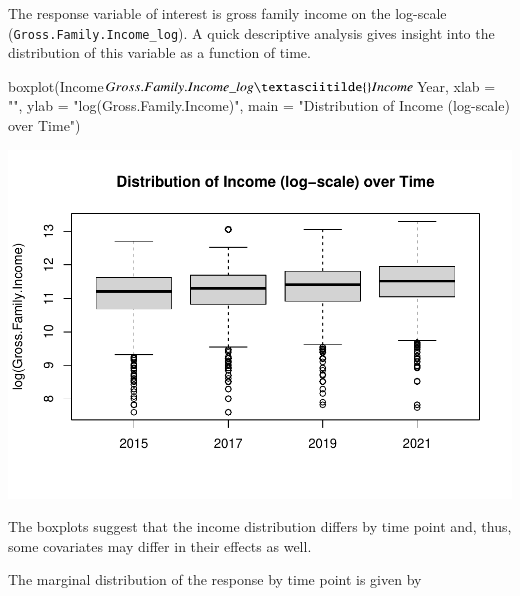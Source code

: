 \documentclass[a4paper, preprint, 3p,
authoryear]{elsarticle} %
\newenvironment{Shaded}{\begin{snugshade}}{\end{snugshade}}
\newcommand{\NormalTok}[1]{#1}
\newcommand{\pandocbounded}[1]{#1}
\begin{document}
The response variable of interest is gross family income on the
log-scale (\texttt{Gross.Family.Income\_log}). A quick descriptive
analysis gives insight into the distribution of this variable as a
function of time.

\begin{Shaded}
\begin{Highlighting}[]
\NormalTok{boxplot(Income$Gross.Family.Income\_log \textasciitilde{} Income$Year,}
\NormalTok{        xlab = "", ylab = "log(Gross.Family.Income)",}
\NormalTok{        main = "Distribution of Income (log{-}scale) over Time")}
\end{Highlighting}
\end{Shaded}

\pandocbounded{\includegraphics[keepaspectratio]{Vignette-for-panelTVP_files/figure-latex/unnamed-chunk-11-1.pdf}}

The boxplots suggest that the income distribution differs by time point
and, thus, some covariates may differ in their effects as well.

The marginal distribution of the response by time point is given by

\begin{Shaded}
\end{Shaded}
\end{document}
